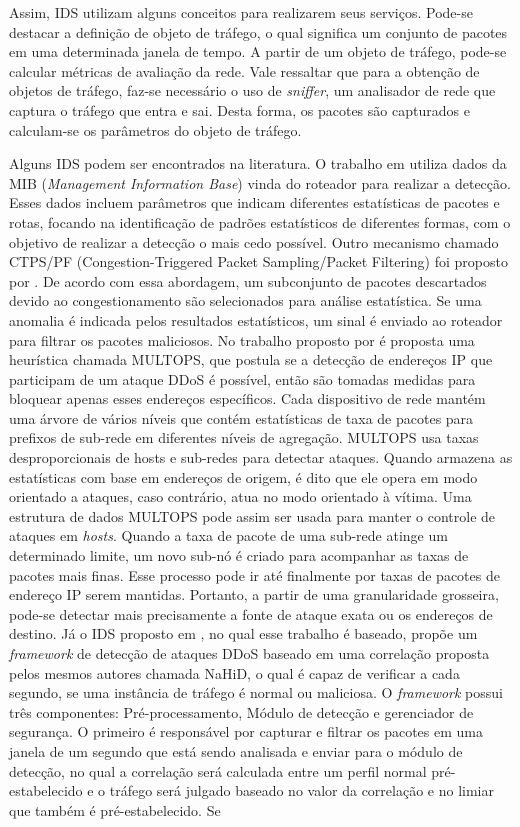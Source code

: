 Assim, IDS utilizam alguns conceitos para realizarem seus serviços. Pode-se destacar a definição de objeto de tráfego, o qual significa um conjunto de pacotes em uma determinada janela de tempo. A partir de um objeto de tráfego, pode-se calcular métricas de avaliação da rede. Vale ressaltar que para a obtenção de objetos de tráfego, faz-se necessário o uso de \textit{sniffer}, um analisador de rede que captura o tráfego que entra e sai. Desta forma, os pacotes são capturados e calculam-se os parâmetros do objeto de tráfego.

Alguns IDS podem ser encontrados na literatura. O trabalho em \cite{cabrera2001proactive} utiliza dados da MIB (\textit{Management Information Base}) vinda do roteador para realizar a detecção. Esses dados incluem parâmetros que indicam diferentes estatísticas de pacotes e rotas, focando na identificação de padrões estatísticos de diferentes formas, com o objetivo de realizar a detecção o mais cedo possível. Outro mecanismo chamado CTPS/PF (Congestion-Triggered Packet Sampling/Packet Filtering) foi proposto por \cite{huang2001countering}. De acordo com essa abordagem, um subconjunto de pacotes descartados devido ao congestionamento são selecionados para análise estatística. Se uma anomalia é indicada pelos resultados estatísticos, um sinal é enviado ao roteador para filtrar os pacotes maliciosos. No trabalho proposto por \cite{multops} é proposta uma heurística chamada MULTOPS, que postula se a detecção de endereços IP que participam de um ataque DDoS é possível, então são tomadas medidas para bloquear apenas esses endereços específicos. Cada dispositivo de rede mantém uma árvore de vários níveis que contém estatísticas de taxa de pacotes para prefixos de sub-rede em diferentes níveis de agregação. MULTOPS usa taxas desproporcionais de hosts e sub-redes para detectar ataques. Quando armazena as estatísticas com base em endereços de origem, é dito que ele opera em modo orientado a ataques, caso contrário, atua no modo orientado à vítima. Uma estrutura de dados MULTOPS pode assim ser usada para manter o controle de ataques em \textit{hosts}. Quando a taxa de pacote de uma sub-rede atinge um determinado limite, um novo sub-nó é criado para acompanhar as taxas de pacotes mais finas. Esse processo pode ir até finalmente por taxas de pacotes de endereço IP serem mantidas. Portanto, a partir de uma granularidade grosseira, pode-se detectar mais precisamente a fonte de ataque exata ou os endereços de destino. Já o IDS proposto em \cite{HOQUE201748}, no qual esse trabalho é baseado,  propõe um \textit{framework} de detecção de ataques DDoS baseado em uma correlação proposta pelos mesmos autores chamada NaHiD, o qual é capaz de verificar a cada segundo, se uma instância de tráfego é normal ou maliciosa. O \textit{framework} possui três componentes: Pré-processamento, Módulo de detecção e gerenciador de segurança. O primeiro é responsável por capturar e filtrar os pacotes em uma janela de um segundo que está sendo analisada e enviar para o módulo de detecção, no qual a correlação será calculada entre um perfil normal pré-estabelecido e o tráfego será julgado baseado no valor da correlação e no limiar que também é pré-estabelecido. Se 
